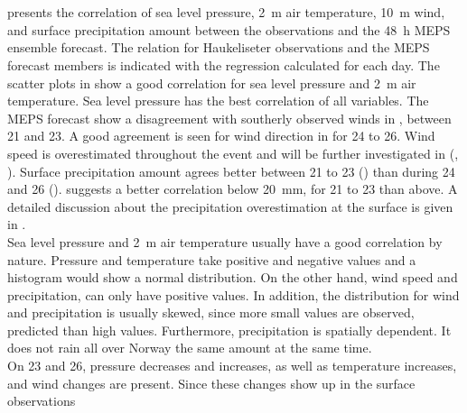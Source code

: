 \\
\\
 presents the correlation of sea level pressure, \SI{2}{\metre} air temperature, \SI{10}{\metre} wind, and surface precipitation amount  between the observations and the \SI{48}{\hour} MEPS ensemble forecast. The relation for Haukeliseter observations and the MEPS forecast members is indicated with the regression calculated for each day. The scatter plots in  show a good correlation for sea level pressure and \SI{2}{\metre} air temperature.
Sea level pressure has the best correlation of  all variables. 
The MEPS forecast show a disagreement with southerly observed winds in , between \num{21} and \SI{23}{\dec}. A good agreement is seen for wind direction in  for \num{24} to \SI{26}{\dec}. 
Wind speed is overestimated throughout the event and will be further investigated in  (, ). 
Surface precipitation amount agrees better between \num{21} to \SI{23}{\dec} () than during \num{24} and \SI{26}{\dec} ().  suggests a better correlation below \SI{20}{\mm}, for \num{21} to \SI{23}{\dec} than above. A detailed discussion about the precipitation overestimation at the surface is given in .
\\
Sea level pressure and \SI{2}{\metre} air temperature usually have a good correlation by nature. Pressure and temperature take positive and negative values and a histogram would show a normal distribution.
On the other hand, wind speed and precipitation, can only have positive values. In addition, the distribution for wind and precipitation is usually skewed, since more small values are observed, predicted than high values.
Furthermore, precipitation is spatially dependent. It does not rain all over Norway the same amount at the same time.
\\
On \num{23} and \SI{26}{\dec}, pressure decreases and increases, as well as temperature increases, and wind changes are present. Since these changes show up in the surface observations %
